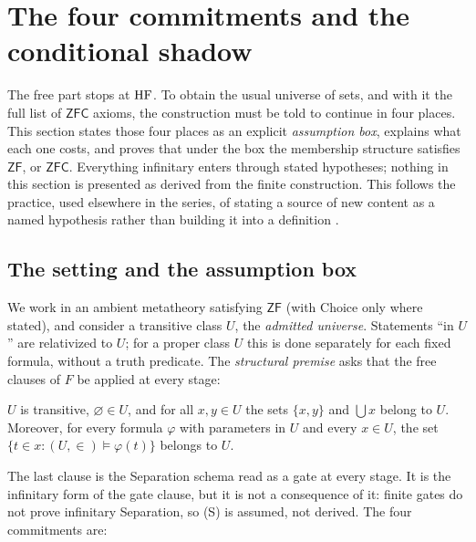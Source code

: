 \section{The four commitments and the conditional shadow}\label{sec:purchases}

The free part stops at $\mathrm{HF}$. To obtain the usual universe of sets, and with it the full list of
$\mathsf{ZFC}$ axioms, the construction must be told to continue in four places. This section
states those four places as an explicit \emph{assumption box}, explains what each one costs, and
proves that under the box the membership structure satisfies $\mathsf{ZF}$, or $\mathsf{ZFC}$.
Everything infinitary enters through stated hypotheses; nothing in this section is presented as
derived from the finite construction. This follows the practice, used elsewhere in the series, of
stating a source of new content as a named hypothesis rather than building it into a definition
\citep{SBTRecognition,SBTIncompleteness}.

\subsection{The setting and the assumption box}\label{ssec:box}

We work in an ambient metatheory satisfying $\mathsf{ZF}$ (with Choice only where stated), and
consider a transitive class $U$, the \emph{admitted universe}. Statements ``in $U$'' are
relativized to $U$; for a proper class $U$ this is done separately for each fixed formula, without
a truth predicate. The \emph{structural premise} asks that the free clauses of $F$ be applied at
every stage:

\begin{description}[leftmargin=1.2em]
\item[\textbf{(S)} Structural premise.] $U$ is transitive, $\varnothing\in U$, and for all
$x,y\in U$ the sets $\{x,y\}$ and $\bigcup x$ belong to $U$. Moreover, for every formula $\varphi$
with parameters in $U$ and every $x\in U$, the set $\{t\in x: (U,\in)\models\varphi(t)\}$ belongs
to $U$.
\end{description}

The last clause is the Separation schema read as a gate at every stage. It is the infinitary form
of the gate clause, but it is not a consequence of it: finite gates do not prove infinitary
Separation, so (S) is assumed, not derived. The four commitments are:

